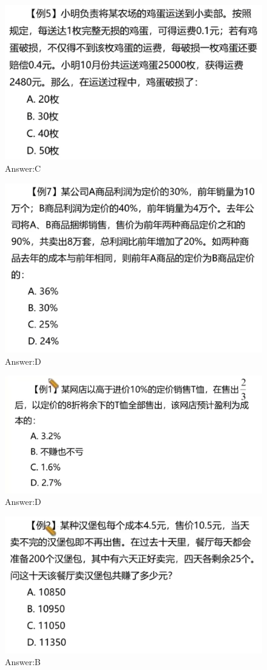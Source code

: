 \documentclass{article}
\numberwithin{equation}{section}						%
\numberwithin{figure}{section}							%
\begin{document}
\begin{sloppypar}
\begin{figure}[H]
     \centering
     \includegraphics[width=0.6\linewidth]{278.png}
		\caption{Answer:C}
\end{figure}

\begin{figure}[H]
     \centering
     \includegraphics[width=0.6\linewidth]{279.png}
		\caption{Answer:D}
\end{figure}


\begin{figure}[H]
     \centering
     \includegraphics[width=0.6\linewidth]{280.png}
		\caption{Answer:D}
\end{figure}



\begin{figure}[H]
     \centering
     \includegraphics[width=0.6\linewidth]{281.png}
		\caption{Answer:B}
\end{figure}



\end{sloppypar}
\end{document}
